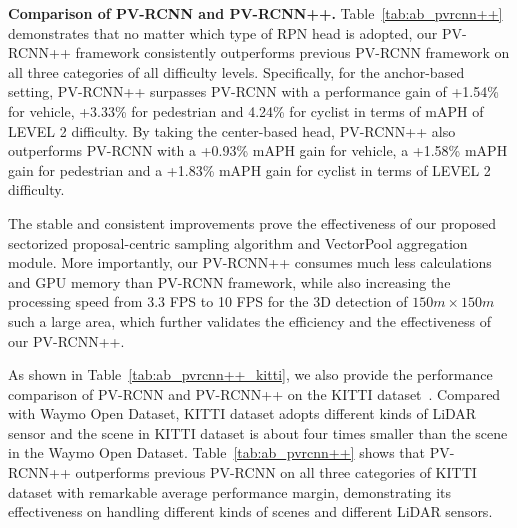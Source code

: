 \documentclass[natbib,twocolumn]{svjour3}          \smartqed  \usepackage{graphicx}
\begin{document}
\begin{table}
	\begin{center}
	\end{center}
	\vspace{-2mm}
	\caption{Performance comparison of PV-RCNN and PV-RCNN++ on the test set of KITTI dataset. The results are evaluated by the most important moderate difficulty level of KITTI evaluation metric by submitting to the official KITTI evaluation server.
	}
	\label{tab:ab_pvrcnn++_kitti}
	\vspace{-2mm}
\end{table}


\noindent
\textbf{Comparison of PV-RCNN and PV-RCNN++.}
Table~\ref{tab:ab_pvrcnn++} demonstrates that no matter which type of RPN head is adopted, our PV-RCNN++ framework consistently outperforms previous PV-RCNN framework on all three categories of all difficulty levels. 
Specifically, for the anchor-based setting, PV-RCNN++ surpasses PV-RCNN with a performance gain of +1.54\% for vehicle, +3.33\% for pedestrian and 4.24\% for cyclist in terms of mAPH of LEVEL 2 difficulty. 
By taking the center-based head, PV-RCNN++ also outperforms PV-RCNN with a +0.93\% mAPH gain for vehicle, a +1.58\% mAPH gain for pedestrian and a +1.83\% mAPH gain for cyclist in terms of LEVEL 2 difficulty. 


The stable and consistent improvements prove the effectiveness of our proposed sectorized proposal-centric sampling algorithm and VectorPool aggregation module. 
More importantly, our PV-RCNN++ consumes much less calculations and GPU memory than PV-RCNN framework, while also increasing the processing speed from 3.3 FPS to 10 FPS for the 3D detection of $150m \times 150m$ such a large area, which further validates the efficiency and the effectiveness of our PV-RCNN++. 

As shown in Table~\ref{tab:ab_pvrcnn++_kitti}, we also provide the performance comparison of PV-RCNN and PV-RCNN++ on the KITTI dataset~\citep{Geiger2012CVPR}. Compared with Waymo Open Dataset, KITTI dataset adopts different kinds of LiDAR sensor and the scene in KITTI dataset is about four times smaller than the scene in the Waymo Open Dataset. 
Table~\ref{tab:ab_pvrcnn++} shows that PV-RCNN++ outperforms previous PV-RCNN on all three categories of KITTI dataset with remarkable average performance margin, demonstrating its effectiveness on handling different kinds of scenes and different LiDAR sensors. 
\end{document}
